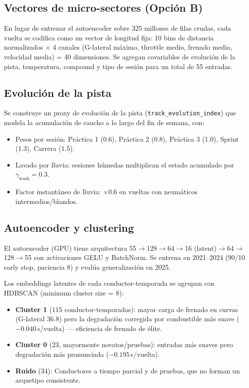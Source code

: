 \documentclass[conference]{IEEEtran}
\begin{document}
\subsection{Vectores de micro-sectores (Opción B)}

En lugar de entrenar el autoencoder sobre 325 millones de filas crudas,
cada vuelta se codifica como un vector de longitud fija: 10 bins de
distancia normalizados $\times$ 4 canales (G-lateral máximo, throttle medio,
frenado medio, velocidad media) = 40 dimensiones. Se agregan covariables
de evolución de la pista, temperatura, compound y tipo de sesión para
un total de 55 entradas.

\subsection{Evolución de la pista}

Se construye un proxy de evolución de la pista
(\texttt{track\_evolution\_index}) que modela la acumulación de caucho
a lo largo del fin de semana, con:
\begin{itemize}
  \item Pesos por sesión: Práctica 1 (0.6), Práctica 2 (0.8),
        Práctica 3 (1.0), Sprint (1.3), Carrera (1.5).
  \item Lavado por lluvia: sesiones húmedas multiplican el
        estado acumulado por $\gamma_{\text{wash}} = 0.3$.
  \item Factor instantáneo de lluvia: $\times 0.6$ en vueltas con
        neumáticos intermedios/blandos.
\end{itemize}

\subsection{Autoencoder y clustering}

El autoencoder (GPU) tiene arquitectura 55$\to$128$\to$64$\to$16
(latent)$\to$64$\to$128$\to$55 con activaciones GELU y BatchNorm.
Se entrena en 2021–2024 (90/10 early stop, paciencia 8) y evalúa
generalización en 2025.

Los embeddings latentes de cada conductor-temporada se agrupan con
HDBSCAN (minimum cluster size = 8):

\begin{itemize}
  \item \textbf{Cluster 1} (115 conductor-temporadas): mayor carga
        de frenado en curvas (G-lateral 36.8) pero la degradación
        corregida por combustible más suave ($-0.040$\,s/vuelta) ---
        eficiencia de frenado de élite.
  \item \textbf{Cluster 0} (23, mayormente novatos/pruebas): entradas
        más suaves pero degradación más pronunciada ($-0.195$\,s/vuelta).
  \item \textbf{Ruido} (34): Conductores a tiempo parcial y de pruebas,
        que no forman un arquetipo consistente.
\end{itemize}
\end{document}

